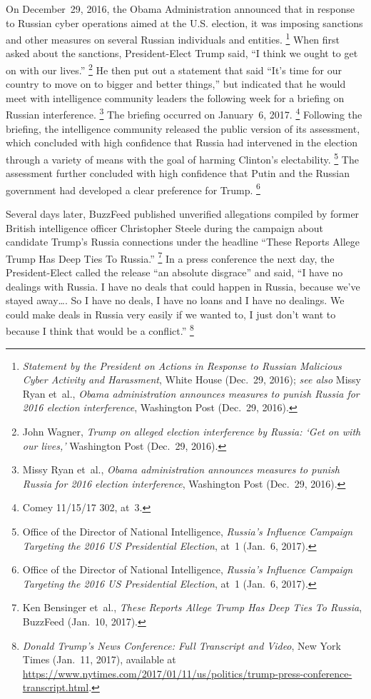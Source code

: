 On December~29, 2016, the Obama Administration announced that in response to Russian cyber operations aimed at the U.S. election, it was imposing sanctions and other measures on several Russian individuals and entities.%
\footnote{\textit{Statement by the President on Actions in Response to Russian Malicious Cyber Activity and Harassment}, White House (Dec.~29, 2016);
\textit{see also} Missy Ryan et~al., \textit{Obama administration announces measures to punish Russia for 2016 election interference}, Washington Post (Dec.~29, 2016).
}
When first asked about the sanctions, President-Elect Trump said, ``I think we ought to get on with our lives.''%
\footnote{John Wagner, \textit{Trump on alleged election interference by Russia: `Get on with our lives,'} Washington Post (Dec.~29, 2016).}
He then put out a statement that said ``It's time for our country to move on to bigger and better things,'' but indicated that he would meet with intelligence community leaders the following week for a briefing on Russian interference.%
\footnote{Missy Ryan et~al., \textit{Obama administration announces measures to punish Russia for 2016 election interference}, Washington Post (Dec.~29, 2016).}
The briefing occurred on January~6, 2017.%
\footnote{Comey 11/15/17 302, at~3.}
Following the briefing, the intelligence community released the public version of its assessment, which concluded with high confidence that Russia had intervened in the election through a variety of means with the goal of harming Clinton's electability.%
\footnote{Office of the Director of National Intelligence, \textit{Russia's Influence Campaign Targeting the 2016 US Presidential Election}, at~1 (Jan.~6, 2017).}
The assessment further concluded with high confidence that Putin and the Russian government had developed a clear preference for Trump.%
\footnote{Office of the Director of National Intelligence, \textit{Russia's Influence Campaign Targeting the 2016 US Presidential Election}, at~1 (Jan.~6, 2017).}

Several days later, BuzzFeed published unverified allegations compiled by former British intelligence officer Christopher Steele during the campaign about candidate Trump's Russia connections under the headline ``These Reports Allege Trump Has Deep Ties To Russia.''%
\footnote{Ken Bensinger et~al., \textit{These Reports Allege Trump Has Deep Ties To Russia}, BuzzFeed (Jan.~10, 2017).}
In a press conference the next day, the President-Elect called the release ``an absolute disgrace'' and said, ``I have no dealings with Russia.
I have no deals that could happen in Russia, because we've stayed away\dots.
So I have no deals, I have no loans and I have no dealings.
We could make deals in Russia very easily if we wanted to, I just don't want to because I think that would be a conflict.''%
\footnote{\textit{Donald Trump's News Conference: Full Transcript and Video}, New York Times (Jan.~11, 2017), available at \url{https://www.nytimes.com/2017/01/11/us/politics/trump-press-conference-transcript.html}.}

